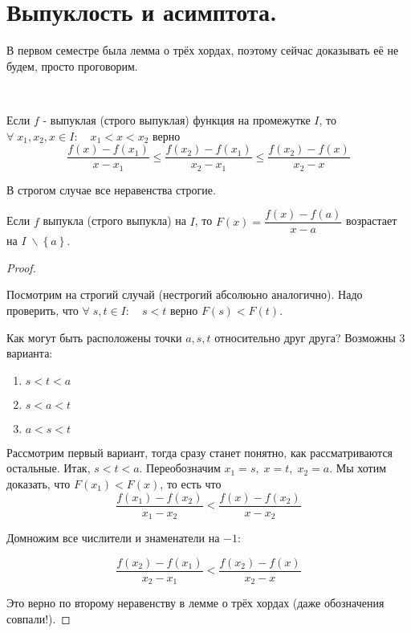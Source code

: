 \documentclass[../main.tex]{subfiles}
\begin{document}
\newpage
\section{Выпуклость и асимптота.}

В первом семестре была лемма о трёх хордах, поэтому сейчас доказывать её не будем, просто проговорим. 

\begin{thm}
    
    ~

    Если \( f\) - выпуклая (строго выпуклая) функция на промежутке \( I\), то \( \forall \; x_1, x_2, x \in I:\quad x_1<x<x_2\) верно
    \[ \dfrac{ f(x)-f(x_1)}{ x-x_1} \leq \dfrac{ f(x_2)-f(x_1)}{ x_2-x_1} \leq \dfrac{ f(x_2)-f(x)}{ x_2-x}\]

    В строгом случае все неравенства строгие. 
\end{thm}

\begin{crl}
        Если \( f\) выпукла (строго выпукла) на \( I\), то \( F\left( x\right)= \dfrac{ f(x)-f(a)}{ x-a}\) возрастает на \( I \;\backslash \left\{ a\right\}\).
\end{crl}
\begin{proof}
    
    ~

    Посмотрим на строгий случай (нестрогий абсолюьно аналогично). Надо проверить, что \( \forall \; s,t \in I:\quad s<t\) верно \( F\left( s\right) < F\left( t\right)\). 

    Как могут быть расположены точки \( a,s,t\) относительно друг друга? Возможны 3 варианта:
    \begin{enumerate}
        \item \( s < t < a\)
        \item \( s < a < t\) 
        \item \( a < s < t\)
    \end{enumerate}

    Рассмотрим первый вариант, тогда сразу станет понятно, как рассматриваются остальные. Итак, 
    \( s < t < a\). Переобозначим \( x_1=s,\;x=t,\;x_2=a\). Мы хотим доказать, что \( F(x_1)<F(x)\), то есть что
    \[ \dfrac{ f(x_1)-f(x_2)}{ x_1-x_2}< \dfrac{ f(x)-f(x_2)}{ x-x_2}\]

    Домножим все числители и знаменатели на \( -1\):

    \[ \dfrac{ f(x_2)-f(x_1)}{ x_2-x_1}< \dfrac{ f(x_2)-f(x)}{ x_2-x}\]

    Это верно по второму неравенству в лемме о трёх хордах (даже обозначения совпали!). 
\end{proof}
\end{document}

